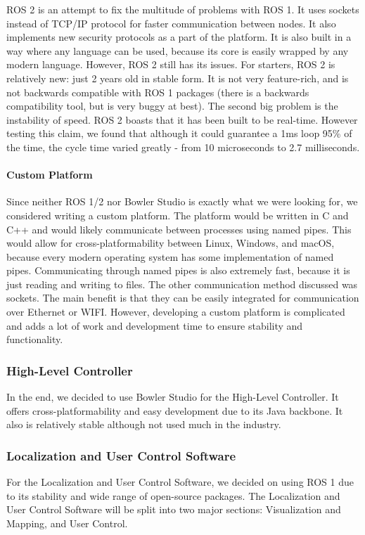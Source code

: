 ROS 2 is an attempt to fix the multitude of problems with ROS 1. It uses sockets instead of TCP/IP protocol for faster communication between nodes. It also implements new security protocols as a part of the platform. It is also built in a way where any language can be used, because its core is easily wrapped by any modern language. 
However, ROS 2 still has its issues. For starters, ROS 2 is relatively new: just 2 years old in stable form. It is not very feature-rich, and is not backwards compatible with ROS 1 packages (there is a backwards compatibility tool, but is very buggy at best). The second big problem is the instability of speed. ROS 2 boasts that it has been built to be real-time. However testing this claim, we found that although it could guarantee a 1ms loop 95\% of the time, the cycle time varied greatly - from 10 microseconds to 2.7 milliseconds.

\paragraph*{Custom Platform}
Since neither ROS 1/2 nor Bowler Studio is exactly what we were looking for, we considered writing a custom platform. The platform would be written in C and C++ and would likely communicate between processes using named pipes. This would allow for cross-platformability between Linux, Windows, and macOS, because every modern operating system has some implementation of named pipes. Communicating through named pipes is also extremely fast, because it is just reading and writing to files. The other communication method discussed was sockets. The main benefit is that they can be easily integrated for communication over Ethernet or WIFI. However, developing a custom platform is complicated and adds a lot of work and development time to ensure stability and functionality.

\subsubsection{High-Level Controller}
In the end, we decided to use Bowler Studio for the High-Level Controller. It offers cross-platformability and easy development due to its Java backbone. It also is relatively stable although not used much in the industry.

\subsubsection{Localization and User Control Software}
For the Localization and User Control Software, we decided on using ROS 1 due to its stability and wide range of open-source packages. The Localization and User Control Software will be split into two major sections: Visualization and Mapping, and User Control.

